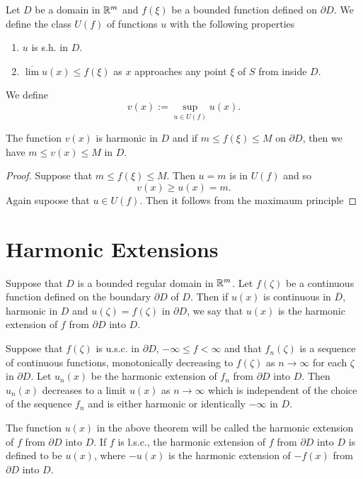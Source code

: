 \begin{definition}
	Let $D$ be a domain in $\mathbb{R}^{m}$ and $f(\xi)$ be a bounded function defined on $\partial D$. We define the class $U(f)$ of functions $u$ with the following properties
	\begin{enumerate}
		\item $u$ is s.h. in $D$.
		\item $\overline{\lim}u(x)\le f(\xi)$ as $x$ approaches any point $\xi$ of $S$ from inside $D$.
	\end{enumerate}
	We define
	\begin{equation}
		v(x):=\sup_{u\in U(f)}u(x).
	\end{equation}

\end{definition}

\begin{lemma}
	The function $v(x)$ is harmonic in $D$ and if $m\le f(\xi)\le M$ on $\partial D$, then we have $m\le v(x)\le M$ in $D$.
\end{lemma}

\begin{proof}
	Suppose that $m\le f(\xi)\le M$. Then $u=m$ is in $U(f)$ and so
	\[
	v(x)\ge u(x)=m.
	\] Again supoose that $u\in  U(f)$. Then it follows from the maximaum principle
\end{proof}



\section{Harmonic Extensions}

\begin{definition}
	Suppose that $D$ is a bounded regular domain in $\mathbb{R}^{m}$. Let $f(\zeta )$ be a continuous function defined on the  boundary $\partial D$ of $D$. Then if $u(x)$ is continuous in $\overline{D}$, harmonic in $D$ and $u(\zeta )=f(\zeta )$ in $\partial D$, we say that $u(x)$ is the harmonic extension of $f$ from $\partial D$ into $D$.
\end{definition}
\begin{theorem}\label{thm:harmonic-extension-general}
	Suppose that $f(\zeta )$ is u.s.c. in $\partial D$, $-\infty\le f<\infty$ and that $f_n(\zeta )$ is a sequence of continuous functions, monotonically decreasing to $f(\zeta )$ as $n\to \infty$ for each $\zeta $ in $\partial D$. Let $u_n(x)$ be the harmonic extension of $f_n$ from $\partial D$ into $D$. Then $u_n(x)$ decreases to a limit $u(x)$ as $n\to \infty$ which is independent of the choice of the sequence $f_n$ and is either harmonic or identically $-\infty$ in $D$.
\end{theorem}	
\begin{definition}
	The function $u(x)$ in the above theorem will be called the harmonic extension of $f$ from $\partial D$ into $D$. If $f$ is l.s.c., the harmonic extension of $f$ from $\partial D$ into $D$ is defined to be $u(x)$, where $-u(x)$ is the harmonic extension of $-f(x)$ from $\partial D$ into $D$.
\end{definition}

